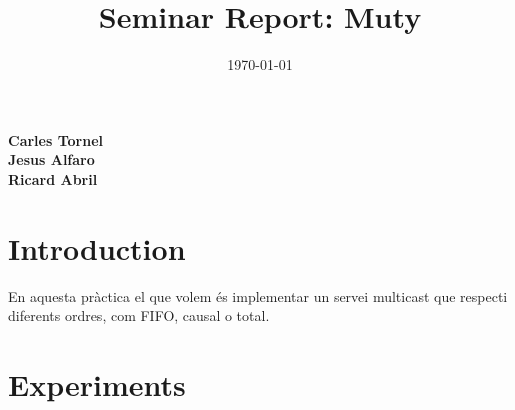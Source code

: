 \documentclass[a4paper, 10pt]{article}
\title{Seminar Report: Muty}
\date{\normalsize\today{}}
\begin{document}
\maketitle

\begin{center}
  \textbf{Carles Tornel}\\
  \textbf{Jesus Alfaro}\\
  \textbf{Ricard Abril}

\end{center}

\section{Introduction}
En aquesta pràctica el que volem és implementar un servei multicast que respecti diferents ordres, com FIFO, causal o total.

\newpage
\section{Experiments}
\end{document}
